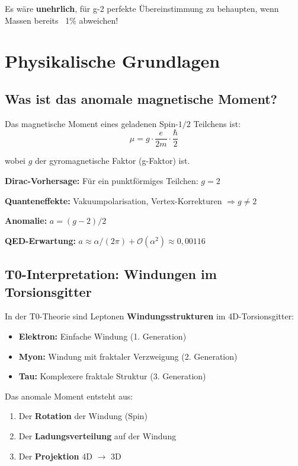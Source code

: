	Es wäre \textbf{unehrlich}, für g-2 perfekte Übereinstimmung zu behaupten, wenn Massen bereits ~1\% abweichen!
	
	\section{Physikalische Grundlagen}
	
	\subsection{Was ist das anomale magnetische Moment?}
	
	Das magnetische Moment eines geladenen Spin-$1/2$ Teilchens ist:
	\begin{equation}
		\mu = g \cdot \frac{e}{2m} \cdot \frac{\hbar}{2}
	\end{equation}
	
	wobei $g$ der gyromagnetische Faktor (g-Faktor) ist.
	
	\textbf{Dirac-Vorhersage:} Für ein punktförmiges Teilchen: $g = 2$
	
	\textbf{Quanteneffekte:} Vakuumpolarisation, Vertex-Korrekturen $\Rightarrow g \neq 2$
	
	\textbf{Anomalie:} $a = (g-2)/2$
	
	\textbf{QED-Erwartung:} $a \approx \alpha/(2\pi) + \mathcal{O}(\alpha^2) \approx 0{,}00116$
	
	\subsection{T0-Interpretation: Windungen im Torsionsgitter}
	
	In der T0-Theorie sind Leptonen \textbf{Windungsstrukturen} im 4D-Torsionsgitter:
	
	\begin{itemize}
		\item \textbf{Elektron:} Einfache Windung (1. Generation)
		\item \textbf{Myon:} Windung mit fraktaler Verzweigung (2. Generation)
		\item \textbf{Tau:} Komplexere fraktale Struktur (3. Generation)
	\end{itemize}
	
	Das anomale Moment entsteht aus:
	\begin{enumerate}
		\item Der \textbf{Rotation} der Windung (Spin)
		\item Der \textbf{Ladungsverteilung} auf der Windung
		\item Der \textbf{Projektion} 4D $\to$ 3D
	\end{enumerate}
	

